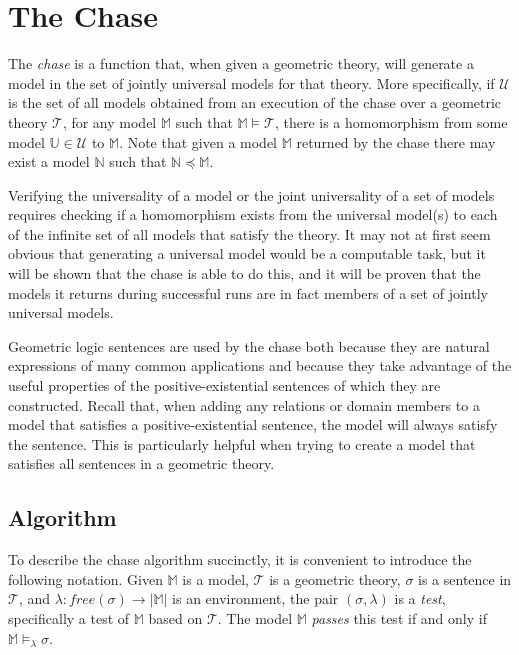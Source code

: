 \section{The Chase}
\label{sec:chase}

	The \emph{chase} is a function that, when given a geometric theory, will
	generate a model in the set of jointly universal models for that theory. More
	specifically, if $\mathcal{U}$ is the set of all models obtained from an
	execution of the chase over a geometric theory $\mathcal{T}$, for any model
	$\mathbb{M}$ such that $\mathbb{M} \models \mathcal{T}$, there is a homomorphism from
	some model $\mathbb{U} \in \mathcal{U}$ to $\mathbb{M}$. Note that given a
	model $\mathbb{M}$ returned by the chase there may exist a model
	$\mathbb{N}$ such that $\mathbb{N} \preceq \mathbb{M}$.

	Verifying the universality of a model or the joint universality of a set of
	models requires checking if a homomorphism exists from the universal model(s)
	to each of the infinite set of all models that satisfy the theory. It may
	not at first seem obvious that generating a universal model would be a
	computable task, but it will be shown that the chase is able to do this,
	and it will be proven that the models it returns during successful runs are
	in fact members of a set of jointly universal models.

	Geometric logic sentences are used by the chase both because they are
	natural expressions of many common applications and because they take
	advantage of the useful properties of the positive-existential sentences
	of which they are constructed. Recall that, when adding any relations or
	domain members to a model that satisfies a positive-existential sentence,
	the model will always satisfy the sentence. This is particularly helpful
	when trying to create a model that satisfies all sentences in a geometric
	theory.

	\subsection{Algorithm}
	\label{sec:chase.algorithm}

		To describe the chase algorithm succinctly, it is convenient to
		introduce the following notation. Given $\mathbb{M}$ is a model, $\mathcal{T}$ is
		a geometric theory, $\sigma$ is a sentence in $\mathcal{T}$, and $\lambda :
		free(\sigma) \to |\mathbb{M}|$ is an environment, the pair
		$(\sigma,\lambda)$ is a \emph{test}, specifically a test of
		$\mathbb{M}$ based on $\mathcal{T}$. The model $\mathbb{M}$ \emph{passes} this
		test if and only if $\mathbb{M} \models_\lambda \sigma$.

